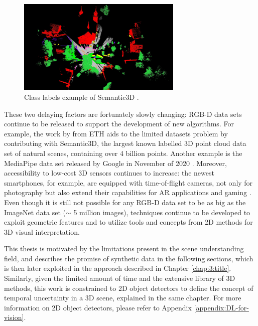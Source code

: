 \begin{figure}[!ht]
        \centering
        \includegraphics[width=0.7\textwidth]{images/sceneU02-hackel.png}
        \caption{Class labels example of Semantic3D \cite{hackel2017semantic3d}.
        }
        \label{fig:3Dsegsem-hackel}
\end{figure}


These two delaying factors are fortunately slowly changing: RGB-D data sets continue to be released to support the development of new algorithms. For example, the work by \textcite{hackel2017semantic3d} from ETH aids to the limited datasets problem by contributing with Semantic3D, the largest known labelled 3D point cloud data set of natural scenes, containing over 4 billion points. Another example is the MediaPipe data set released by Google in November of 2020 \cite{objectron2021dataset}. Moreover, accessibility to low-cost 3D sensors continues to increase: the newest smartphones, for example, are equipped with time-of-flight cameras, not only for photography but also extend their capabilities for AR applications and gaming \cite{tian2019occlusion}. Even though it is still not possible for any RGB-D data set to be as big as the ImageNet data set ($\sim$ 5 million images), techniques continue to be developed to exploit geometric features and to utilize tools and concepts from 2D methods for 3D visual interpretation.

This thesis is motivated by the limitations present in the scene understanding field, and describes the promise of synthetic data in the following sections, which is then later exploited in the approach described in Chapter \ref{chap:3:title}. Similarly, given the limited amount of time and the extensive library of 3D methods, this work is constrained to 2D object detectors to define the concept of temporal uncertainty in a 3D scene, explained in the same chapter.
For more information on 2D object detectors, please refer to Appendix \ref{appendix:DL-for-vision}.


